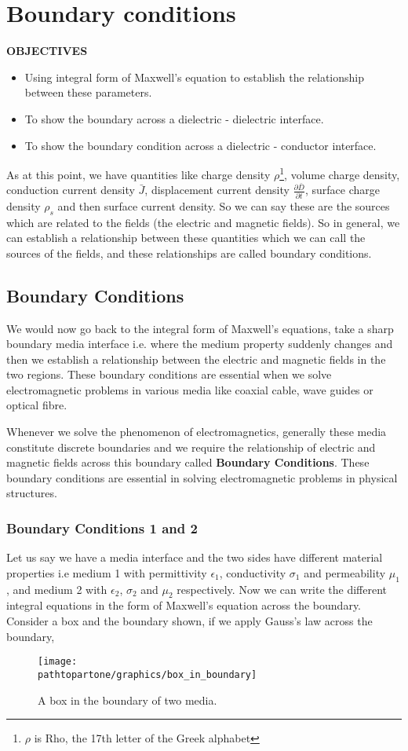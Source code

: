 \chapter{Boundary conditions}\label{lec:lec20}
\textbf{OBJECTIVES}
\begin{itemize}
\item Using integral form of Maxwell's equation to establish the relationship between these parameters.
\item To show the boundary across a dielectric - dielectric interface.
\item To show the boundary condition across a dielectric - conductor interface.
\end{itemize}

As at this point, we have quantities like charge density $\rho$\footnote[1]{$\rho$ is Rho, the 17th letter of the Greek alphabet}, volume charge density, conduction current density $\bar{J}$, displacement current density $\frac{\partial \bar{D}}{\partial t}$, surface charge density $\rho_s$ and then surface current density. So we can say these are the sources which are related to the fields (the electric and magnetic fields). So in general, we can establish a relationship between these quantities which we can call the sources of the fields, and these relationships are called boundary conditions.

\section{Boundary Conditions}

We would now go back to the integral form of Maxwell's equations, take a sharp boundary media interface i.e. where the medium property suddenly changes and then we establish a relationship between the electric and magnetic fields in the two regions. These boundary conditions are essential when we solve electromagnetic problems in various media like coaxial cable, wave guides or optical fibre.

Whenever we solve the phenomenon of electromagnetics, generally these media constitute discrete boundaries and we require the relationship of electric and magnetic fields across this boundary called \textbf{Boundary Conditions}. These boundary conditions are essential in solving electromagnetic problems in physical structures.

\subsection{Boundary Conditions 1 and 2}
Let us say we have a media interface and the two sides have different material properties i.e medium 1 with permittivity $\epsilon_1$, conductivity $\sigma_1$ and permeability $\mu_1$, and medium 2 with $\epsilon_2$, $\sigma_2$ and $\mu_2$ respectively. Now we can write the different integral equations in the form of Maxwell's equation across the boundary. Consider a box and the boundary shown, if we apply Gauss's law across the boundary,
\begin{figure}[h]
\centering
\texttt{[image: \\pathtopartone/graphics/box\_in\_boundary]}
\caption{A box in the boundary of two media.}
\end{figure}

